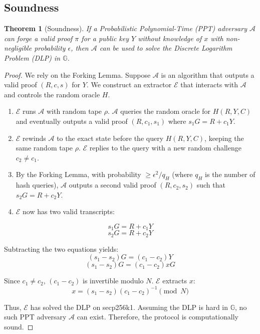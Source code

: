 \documentclass[11pt,a4paper]{article}
\newtheorem{theorem}{Theorem}
\begin{document}
\subsection{Soundness}
\begin{theorem}[Soundness]
If a Probabilistic Polynomial-Time (PPT) adversary $\mathcal{A}$ can forge a valid proof $\pi$ for a public key $Y$ without knowledge of $x$ with non-negligible probability $\epsilon$, then $\mathcal{A}$ can be used to solve the Discrete Logarithm Problem (DLP) in $\mathbb{G}$.
\end{theorem}
\begin{proof}
We rely on the Forking Lemma. Suppose $\mathcal{A}$ is an algorithm that outputs a valid proof $(R, c, s)$ for $Y$. We construct an extractor $\mathcal{E}$ that interacts with $\mathcal{A}$ and controls the random oracle $H$.

\begin{enumerate}
    \item $\mathcal{E}$ runs $\mathcal{A}$ with random tape $\rho$. $\mathcal{A}$ queries the random oracle for $H(R, Y, C)$ and eventually outputs a valid proof $(R, c_1, s_1)$ where $s_1G = R + c_1Y$.

    \item $\mathcal{E}$ rewinds $\mathcal{A}$ to the exact state before the query $H(R, Y, C)$, keeping the same random tape $\rho$. $\mathcal{E}$ replies to the query with a new random challenge $c_2 \neq c_1$.

    \item By the Forking Lemma, with probability $\geq \epsilon^2 / q_H$ (where $q_H$ is the number of hash queries), $\mathcal{A}$ outputs a second valid proof $(R, c_2, s_2)$ such that $s_2G = R + c_2Y$.

    \item $\mathcal{E}$ now has two valid transcripts:
\end{enumerate}
\[ s_1G = R + c_1Y \]
\[ s_2G = R + c_2Y \]

Subtracting the two equations yields:
\[ (s_1 - s_2)G = (c_1 - c_2)Y \]
\[ (s_1 - s_2)G = (c_1 - c_2)xG \]

Since $c_1 \neq c_2$, $(c_1 - c_2)$ is invertible modulo $N$. $\mathcal{E}$ extracts $x$:
\[ x = (s_1 - s_2)(c_1 - c_2)^{-1} \pmod N \]

Thus, $\mathcal{E}$ has solved the DLP on secp256k1. Assuming the DLP is hard in $\mathbb{G}$, no such PPT adversary $\mathcal{A}$ can exist. Therefore, the protocol is computationally sound.
\end{proof}
\end{document}
